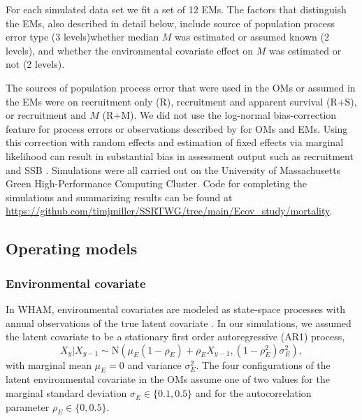 \documentclass[
  12pt,
]{article}
\providecommand{\DIFadd}[1]{{\protect\color{blue}\uwave{#1}}} %
\providecommand{\DIFaddbegin}{} %
\providecommand{\DIFaddend}{} %
\providecommand{\DIFdelbegin}{} %
\providecommand{\DIFdelend}{} %
\providecommand{\DIFscaledelfig}{0.5}
\newlength{\DIFdelgraphicswidth} %
\newlength{\DIFdelgraphicsheight} %
\providecommand{\DIFaddincludegraphics}[2][]{{\color{blue}\fbox{\DIFOincludegraphics[#1]{#2}}}} %
\providecommand{\DIFdelincludegraphics}[2][]{%
\sbox{\DIFdelgraphicsbox}{\DIFOincludegraphics[#1]{#2}}%
\settoboxwidth{\DIFdelgraphicswidth}{\DIFdelgraphicsbox} %
\settoboxtotalheight{\DIFdelgraphicsheight}{\DIFdelgraphicsbox} %
\scalebox{\DIFscaledelfig}{%
\parbox[b]{\DIFdelgraphicswidth}{\usebox{\DIFdelgraphicsbox}\\[-\baselineskip] \rule{\DIFdelgraphicswidth}{0em}}\llap{\resizebox{\DIFdelgraphicswidth}{\DIFdelgraphicsheight}{%
\setlength{\unitlength}{\DIFdelgraphicswidth}%
\begin{picture}(1,1)%
\thicklines\linethickness{2pt} %
{\color[rgb]{1,0,0}\put(0,0){\framebox(1,1){}}}%
{\color[rgb]{1,0,0}\put(0,0){\line( 1,1){1}}}%
{\color[rgb]{1,0,0}\put(0,1){\line(1,-1){1}}}%
\end{picture}%
}\hspace*{3pt}}} %
} %
\DeclareRobustCommand{\DIFaddbegin}{\DIFOaddbegin \let\includegraphics\DIFaddincludegraphics} %
\DeclareRobustCommand{\DIFaddend}{\DIFOaddend \let\includegraphics\DIFOincludegraphics} %
\DeclareRobustCommand{\DIFdelbegin}{\DIFOdelbegin \let\includegraphics\DIFdelincludegraphics} %
\DeclareRobustCommand{\DIFdelend}{\DIFOaddend \let\includegraphics\DIFOincludegraphics} %
\begin{document}
For each simulated data set we fit a set of 12 EMs. The factors that
distinguish the EMs, also described in detail below, include source of
population process error type (3 levels)\DIFaddbegin \DIFadd{, }\DIFaddend whether median \(M\) was
estimated or assumed known (2 levels), and whether the environmental
covariate effect on \(M\) was estimated or not (2 levels).

The sources of population process error that were used in the OMs or
assumed in the EMs were on recruitment only (R), recruitment and
apparent survival (R+S), or recruitment and \(M\) (R+M). We did not use
the log-normal bias-correction feature for process errors or
observations described by \citet{stockmiller21} for OMs and EMs. Using
this correction with random effects and estimation of fixed effects via
marginal likelihood can result in substantial bias in assessment output
such as recruitment and SSB \citep{lietal26}. Simulations were all
carried out on the University of Massachusetts Green High-Performance
Computing Cluster. Code for completing the simulations and summarizing
results can be found at
\DIFdelbegin %
\DIFdelend \DIFaddbegin \url{https://github.com/timjmiller/SSRTWG/tree/main/Ecov_study/mortality}\DIFaddend .

\subsection*{Operating models}\label{operating-models}

\subsubsection*{Environmental covariate}\label{environmental-covariate}

In WHAM, environmental covariates are modeled as state-space processes
with annual observations of the true latent covariate
\citep{milleretal16, stockmiller21}. In our simulations, we assumed the
latent covariate to be a stationary first order autoregressive (AR1)
process, \[
X_y|X_{y-1} \sim \text{N}\left(\mu_E\left(1-\rho_E\right) + \rho_E X_{y-1}, \left(1-\rho_E^2\right)\sigma^2_E\right),
\] with marginal mean \(\mu_E=0\) and variance \(\sigma^2_E\). The four
configurations of the latent environmental covariate in the OMs assume
one of two values for the marginal standard deviation
\(\sigma_E \in \{0.1, 0.5\}\) and for the autocorrelation parameter
\(\rho_E \in \{0, 0.5\}\).
\end{document}
